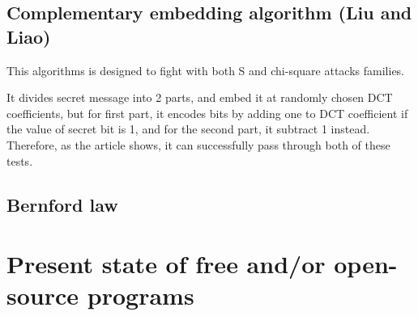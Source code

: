 
\subsection{Complementary embedding algorithm (Liu and Liao)}

This algorithms is designed to fight with both S and chi-square attacks families.

It divides secret message into 2 parts, and embed it at randomly chosen DCT coefficients,
but for first part, it encodes bits by adding one to DCT coefficient if the value of 
secret bit is 1, and for the second part, it subtract 1 instead. Therefore, as the article
\cite{liu2008high} shows, it can successfully pass through both of these tests.

\subsection{Bernford law}

\section{Present state of free and/or open-source programs}
